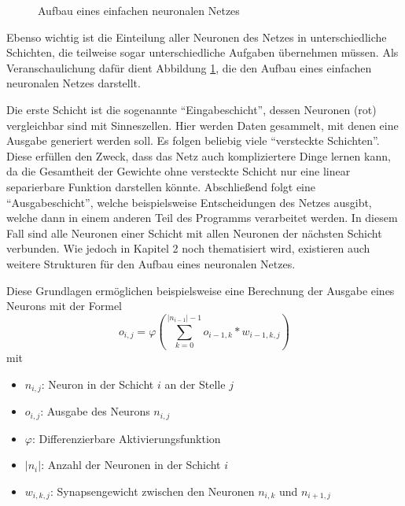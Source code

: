 \documentclass[12pt,a4]{article}
\begin{document}
\begin{figure}[!h]
\caption{Aufbau eines einfachen neuronalen Netzes}
\label{fig:Netzaufbau}
\end{figure}

Ebenso wichtig ist die Einteilung aller Neuronen des Netzes in unterschiedliche Schichten, die teilweise sogar unterschiedliche Aufgaben übernehmen müssen. Als Veranschaulichung dafür dient Abbildung \ref{fig:Netzaufbau}, die den Aufbau eines einfachen neuronalen Netzes darstellt. 

Die erste Schicht ist die sogenannte \enquote{Eingabeschicht}, dessen Neuronen (rot) vergleichbar sind mit Sinneszellen. Hier werden Daten gesammelt, mit denen eine Ausgabe generiert werden soll. Es folgen beliebig viele \enquote{versteckte Schichten}. Diese erfüllen den Zweck, dass das Netz auch kompliziertere Dinge lernen kann, da die Gesamtheit der Gewichte ohne versteckte Schicht nur eine linear separierbare Funktion darstellen könnte. Abschließend folgt eine \enquote{Ausgabeschicht}, welche beispielsweise Entscheidungen des Netzes ausgibt, welche dann in einem anderen Teil des Programms verarbeitet werden. In diesem Fall sind alle Neuronen einer Schicht mit allen Neuronen der nächsten Schicht verbunden. Wie jedoch in Kapitel 2 noch thematisiert wird, existieren auch weitere Strukturen für den Aufbau eines neuronalen Netzes.

Diese Grundlagen ermöglichen beispielsweise eine Berechnung der Ausgabe eines Neurons mit der Formel
\begin{equation}
o_{i, j} = \varphi \left( \sum\limits_{k=0}^{|n_{i-1}| - 1} o_{i-1, k} * w_{i - 1, k, j} \right)
\end{equation}
mit
\begin{itemize}
\item $n_{i, j}$: Neuron in der Schicht $i$ an der Stelle $j$
\item $o_{i, j}$: Ausgabe des Neurons $n_{i, j}$
\item $\varphi$: Differenzierbare Aktivierungsfunktion
\item $|n_i|$: Anzahl der Neuronen in der Schicht $i$
\item $w_{i, k, j}$: Synapsengewicht zwischen den Neuronen $n_{i, k}$ und $n_{i+1, j}$
\end{itemize}
\end{document}
